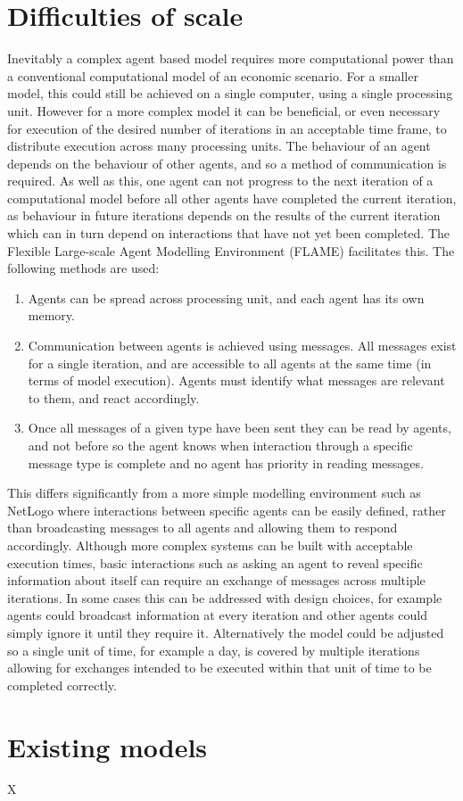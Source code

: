 \documentclass[11pt]{article}
\begin{document}
\section{Difficulties of scale}
Inevitably a complex agent based model requires more computational power than a conventional computational model of an economic scenario. For a smaller model, this could still be achieved on a single computer, using a single processing unit. However for a more complex model it can be beneficial, or even necessary for execution of the desired number of iterations in an acceptable time frame, to distribute execution across many processing units. The behaviour of an agent depends on the behaviour of other agents, and so a method of communication is required. As well as this, one agent can not progress to the next iteration of a computational model before all other agents have completed the current iteration, as behaviour in future iterations depends on the results of the current iteration which can in turn depend on interactions that have not yet been completed. The Flexible Large-scale Agent Modelling Environment (FLAME) \cite{flame} facilitates this. The following methods are used:
\begin{enumerate}
	\item Agents can be spread across processing unit, and each agent has its own memory.
	\item Communication between agents is achieved using messages. All messages exist for a single iteration, and are accessible to all agents at the same time (in terms of model execution). Agents must identify what messages are relevant to them, and react accordingly.
	\item Once all messages of a given type have been sent they can be read by agents, and not before so the agent knows when interaction through a specific message type is complete and no agent has priority in reading messages.
\end{enumerate}
This differs significantly from a more simple modelling environment such as NetLogo \cite{netlogo} where interactions between specific agents can be easily defined, rather than broadcasting messages to all agents and allowing them to respond accordingly. Although more complex systems can be built with acceptable execution times, basic interactions such as asking an agent to reveal specific information about itself can require an exchange of messages across multiple iterations. In some cases this can be addressed with design choices, for example agents could broadcast information at every iteration and other agents could simply ignore it until they require it. Alternatively the model could be adjusted so a single unit of time, for example a day, is covered by multiple iterations allowing for exchanges intended to be executed within that unit of time to be completed correctly.

\section{Existing models}
X

\begin{flushleft}
\printbibliography
\end{flushleft}
\end{document}
